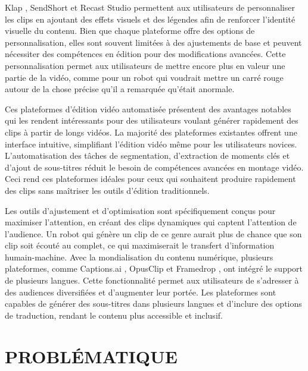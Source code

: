 \documentclass[livre]{udes-genie-these}
\begin{document}
Klap \cite{klap2024}, SendShort \cite{sendshort2024} et Recast Studio \cite{recast2024} permettent aux utilisateurs de personnaliser les clips en ajoutant des effets visuels et des légendes afin de renforcer l’identité visuelle du contenu. Bien que chaque plateforme offre des options de personnalisation, elles sont souvent limitées à des ajustements de base et peuvent nécessiter des compétences en édition pour des modifications avancées. Cette personnalisation permet aux utilisateurs de mettre encore plus en valeur une partie de la vidéo, comme pour un robot qui voudrait mettre un carré rouge autour de la chose précise qu’il a remarquée qu’était anormale.

Ces plateformes d’édition vidéo automatisée présentent des avantages notables qui les rendent intéressants pour des utilisateurs voulant générer rapidement des clips à partir de longs vidéos. La majorité des plateformes existantes offrent une interface intuitive, simplifiant l’édition vidéo même pour les utilisateurs novices. L’automatisation des tâches de segmentation, d’extraction de moments clés et d’ajout de sous-titres réduit le besoin de compétences avancées en montage vidéo. Ceci rend ces plateformes idéales pour ceux qui souhaitent produire rapidement des clips sans maîtriser les outils d’édition traditionnels.

Les outils d’ajustement et d’optimisation sont spécifiquement conçus pour maximiser l’attention, en créant des clips dynamiques qui captent l’attention de l’audience. Un robot qui génère un clip de ce genre aurait plus de chance que son clip soit écouté au complet, ce qui maximiserait le transfert d’information humain-machine. Avec la mondialisation du contenu numérique, plusieurs plateformes, comme Captions.ai \cite{captions2024}, OpusClip \cite{opusclip2024} et Framedrop \cite{framedrop2024}, ont intégré le support de plusieurs langues. Cette fonctionnalité permet aux utilisateurs de s’adresser à des audiences diversifiées et d’augmenter leur portée. Les plateformes sont capables de générer des sous-titres dans plusieurs langues et d’inclure des options de traduction, rendant le contenu plus accessible et inclusif.


\chapter{PROBLÉMATIQUE}
\end{document}

